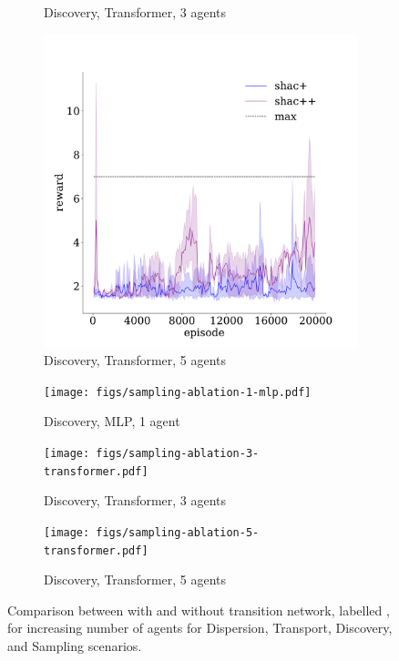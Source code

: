 \begin{figure}[!t]
\begin{subfigure}[b]{0.30\textwidth}
        \caption{Discovery, Transformer, 3 agents}
        \label{fig:discovery-ablation-transformer-3}
    \end{subfigure}
    \begin{subfigure}[b]{0.30\textwidth}
        \includegraphics[width=\textwidth]{figs/discovery-ablation-5-transformer.pdf}
        \caption{Discovery, Transformer, 5 agents}
        \label{fig:discovery-ablation-transformer-5}
    \end{subfigure}

    \begin{subfigure}[b]{0.30\textwidth}
        \texttt{[image: figs/sampling-ablation-1-mlp.pdf]}
        \caption{Discovery, MLP, 1 agent}
        \label{fig:sampling-ablation-mlp-1}
    \end{subfigure}
    \begin{subfigure}[b]{0.30\textwidth}
        \texttt{[image: figs/sampling-ablation-3-transformer.pdf]}
        \caption{Discovery, Transformer, 3 agents}
        \label{fig:sampling-ablation-transformer-3}
    \end{subfigure}
    \begin{subfigure}[b]{0.30\textwidth}
        \texttt{[image: figs/sampling-ablation-5-transformer.pdf]}
        \caption{Discovery, Transformer, 5 agents}
        \label{fig:sampling-ablation-transformer-5}
    \end{subfigure}

    \caption{Comparison between \fname{} with and without transition network, labelled \fnamer{}, for increasing number of agents for Dispersion, Transport, Discovery, and Sampling scenarios.}
    \label{fig:ablation}
\end{figure}




